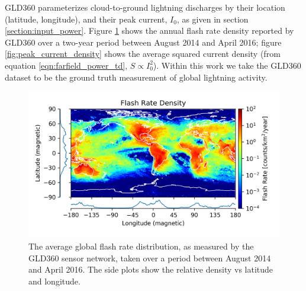 GLD360 parameterizes cloud-to-ground lightning discharges by their location (latitude, longitude), and their peak current, $I_0$, as given in section \ref{section:input_power}. Figure \ref{fig:flash_rate_density} shows the annual flash rate density reported by GLD360 over a two-year period between August 2014 and April 2016; figure \ref{fig:peak_current_density} shows the average squared current density (from equation \eqref{eqn:farfield_power_td}, $S \propto I_0^2$). Within this work we take the GLD360 dataset to be the ground truth measurement of global lightning activity.

\begin{figure}[h!]
\begin{center}
\includegraphics{figures/flash_rate_density.png}
\end{center}
\caption[Average global flash rate]{The average global flash rate distribution, as measured by the GLD360 sensor network, taken over a period between August 2014 and April 2016. The side plots show the relative density vs latitude and longitude.}
\label{fig:flash_rate_density}
\end{figure}
